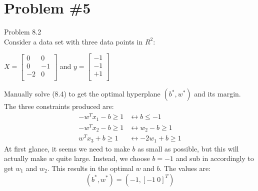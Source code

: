 \documentclass[12pt]{article}
\begin{document}
	\section*{Problem \#5}
	Problem 8.2 \\
	Consider a data set with three data points in $R^2$: \\
	\begin{center}
		$X = \left[
		\begin{array}{cc}
		0 & 0 \\
		0 &-1 \\
		-2 & 0 \\
		\end{array}
		\right]$ and $y = \left[ 
		\begin{array}{c}
		-1\\
		-1\\
		+1\\
		\end{array} \right]$
	\end{center}
	Manually solve (8.4) to get the optimal hyperplane $(b^* , w^* )$ and its margin. \\
	The three constraints produced are:
	\begin{align*}
		-w^Tx_1 -b \ge 1 &\leftrightarrow b \le -1 \\
		-w^Tx_2 -b \ge 1 &\leftrightarrow w_2 -b \ge 1 \\
		w^Tx_3 +b \ge 1 &\leftrightarrow -2w_1+b \ge 1
	\end{align*}
	At first glance, it seems we need to make $b$ as small as possible, but this will actually make $w$ quite large. Instead, we choose $b=-1$ and sub in accordingly to get $w_1$ and $w_2$. This results in the optimal $w$ and $b$. The values are:
	\begin{equation*}
		(b^* , w^* ) = (-1, [-1 \ 0]^T)
	\end{equation*}
	
\end{document}
